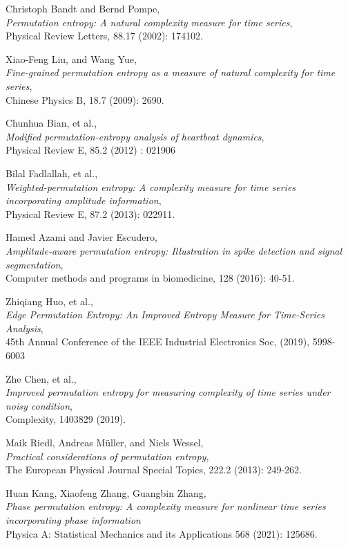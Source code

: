 \documentclass[12pt, a4paper, titlepage, openany]{book}
\begin{document}
\begin{thebibliography}{9}
Christoph Bandt and Bernd Pompe, \\
\emph{Permutation entropy: A natural complexity measure for time series},\\
Physical Review Letters,  88.17 (2002): 174102.
 
Xiao-Feng Liu, and Wang Yue,\\
\emph{Fine-grained permutation entropy as a measure of natural complexity for time series},\\
Chinese Physics B, 18.7 (2009): 2690.
 
Chunhua Bian, et al.,\\
\emph{Modified permutation-entropy analysis of heartbeat dynamics},\\
Physical Review E,  85.2 (2012) : 021906
 
Bilal Fadlallah, et al.,\\
\emph{Weighted-permutation entropy: A complexity measure for time series incorporating amplitude information},\\
Physical Review E, 87.2 (2013): 022911.
 
Hamed Azami and Javier Escudero,\\
\emph{Amplitude-aware permutation entropy: Illustration in spike detection and signal segmentation},\\
Computer methods and programs in biomedicine, 128 (2016): 40-51.
 
Zhiqiang Huo, et al.,\\
\emph{Edge Permutation Entropy: An Improved Entropy Measure for Time-Series Analysis},\\
45th Annual Conference of the IEEE Industrial Electronics Soc, (2019), 5998-6003
 
Zhe Chen, et al., \\
\emph{Improved permutation entropy for measuring complexity of time series under noisy condition},\\
Complexity, 1403829 (2019).
 
Maik Riedl, Andreas Müller, and Niels Wessel,\\
\emph{Practical considerations of permutation entropy},\\
The European Physical Journal Special Topics, 222.2 (2013): 249-262.

Huan Kang, Xiaofeng Zhang, Guangbin Zhang, \\
\emph{Phase permutation entropy: A complexity measure for nonlinear time series incorporating phase information} \\
Physica A: Statistical Mechanics and its Applications 568 (2021): 125686. \\


\end{thebibliography}
\end{document}
